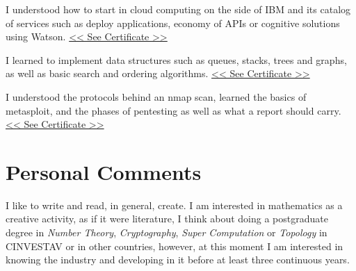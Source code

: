 \documentclass[]{friggeri-cv}
\begin{document}
\begin{entrylist}
  {I understood how to start in cloud computing on the side of IBM and its catalog of services such as deploy applications, economy of APIs or cognitive solutions using Watson. \href{https://drive.google.com/file/d/1rtJuI9LZY-5HCclYUGmYYYGadnAICH3D/view?usp=sharing}{<<  See Certificate >>}
  }

 {I learned to implement data structures such as queues, stacks, trees and graphs, as well as basic search and ordering algorithms.
  \href{https://drive.google.com/file/d/1YMPauE56JO_EAAnPZ4PvS5xyCPK-3MMs/view?usp=sharing}{<<  See Certificate >>}
  }
  
  {I understood the protocols behind an nmap scan, learned the basics of metasploit, and the phases of pentesting as well as what a report should carry. \href{https://drive.google.com/file/d/1FMRABdPX0U9CDHdARuaY6e60bueEHbId/view?usp=sharing}{<<  See Certificate >>}
  }
\end{entrylist}



\section{Personal Comments}
\justify
I like to write and read, in general, create. I am interested in mathematics as a creative activity, as if it were literature, I think about doing a postgraduate degree in \textit{Number Theory}, \textit{Cryptography}, \textit{Super Computation} or \textit{Topology} in CINVESTAV or in other countries, however, at this moment I am interested in knowing the industry and developing in it before at least three continuous years.
\end{document}
